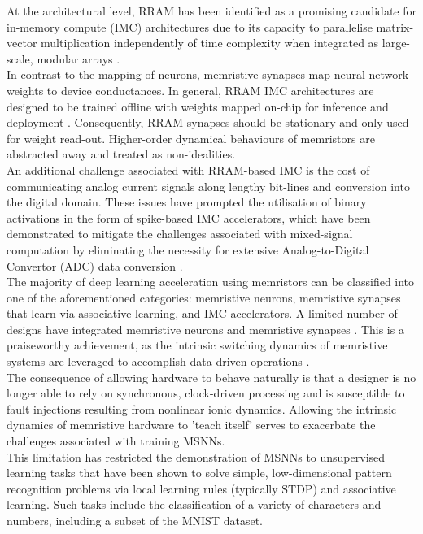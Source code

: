 \noindent At the architectural level, RRAM has been identified as a promising candidate for in-memory compute (IMC) architectures \cite{li2018analog} due to its capacity to parallelise matrix-vector multiplication independently of time complexity when integrated as large-scale, modular arrays \cite{eshraghian20213}. \\

\noindent In contrast to the mapping of neurons, memristive synapses map neural network weights to device conductances. In general, RRAM IMC architectures are designed to be trained offline with weights mapped on-chip for inference and deployment \cite{zhang2020brain}. Consequently, RRAM synapses should be stationary and only used for weight read-out. Higher-order dynamical behaviours of memristors are abstracted away and treated as non-idealities.\\

\noindent An additional challenge associated with RRAM-based IMC is the cost of communicating analog current signals along lengthy bit-lines and conversion into the digital domain. These issues have prompted the utilisation of binary activations in the form of spike-based IMC accelerators, which have been demonstrated to mitigate the challenges associated with mixed-signal computation by eliminating the necessity for extensive Analog-to-Digital Convertor (ADC) data conversion \cite{eshraghian2022memristor}. \\

\noindent The majority of deep learning acceleration using memristors can be classified into one of the aforementioned categories: memristive neurons, memristive synapses that learn via associative learning, and IMC accelerators. A limited number of designs have integrated memristive neurons and memristive synapses \cite{wang2018fully}. This is a praiseworthy achievement, as the intrinsic switching dynamics of memristive systems are leveraged to accomplish data-driven operations \cite{tang2020fully}. \\

\noindent The consequence of allowing hardware to behave naturally is that a designer is no longer able to rely on synchronous, clock-driven processing and is susceptible to fault injections resulting from nonlinear ionic dynamics. Allowing the intrinsic dynamics of memristive hardware to 'teach itself' serves to exacerbate the challenges associated with training MSNNs. \\

\noindent This limitation has restricted the demonstration of MSNNs to unsupervised learning tasks that have been shown to solve simple, low-dimensional pattern recognition problems via local learning rules (typically STDP) and associative learning. Such tasks include the classification of a variety of characters and numbers, including a subset of the MNIST dataset. \\

